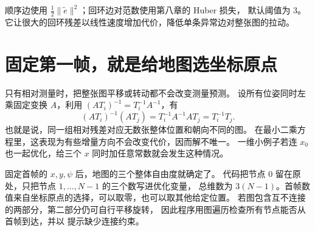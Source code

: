 顺序边使用 $\tfrac12\|\widetilde e\|^2$；回环边对范数使用第八章的 Huber 损失，
默认阈值为 3。它让很大的回环残差以线性速度增加代价，降低单条异常边对整张图的拉动。

\section{固定第一帧，就是给地图选坐标原点}
只有相对测量时，把整张图平移或转动都不会改变测量预测。
设所有位姿同时左乘固定变换 $A$，利用 $(AT_i)^{-1}=T_i^{-1}A^{-1}$，有
\begin{equation}
(AT_i)^{-1}(AT_j)=T_i^{-1}A^{-1}AT_j=T_i^{-1}T_j.
\end{equation}
也就是说，同一组相对残差对应无数张整体位置和朝向不同的图。
在最小二乘方程里，这表现为有些增量方向不会改变代价，因而解不唯一。
一维小例子若连 $x_0$ 也一起优化，给三个 $x$ 同时加任意常数就会发生这种情况。

固定首帧的 $x,y,\psi$ 后，地图的三个整体自由度就确定了。
代码把节点 0 留在原处，只把节点 $1,\ldots,N-1$ 的三个数写进优化变量，
总维数为 $3(N-1)$。首帧数值来自坐标原点的选择，可以取零，也可以取其他给定位置。
若图包含互不连接的两部分，第二部分仍可自行平移旋转，
因此程序用图遍历检查所有节点能否从首帧到达，并以  提示缺少连接约束。

